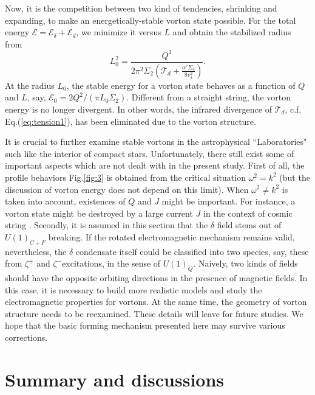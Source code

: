 \documentclass[12pt]{article}
\begin{document}
Now, it is the competition between two kind of tendencies, shrinking and expanding, to make an energetically-stable vorton state possible. For the total energy $\mathcal{E} = \mathcal{E}_\delta + \mathcal{E}_d$, we minimize it versus $L$ and obtain the stabilized radius from  
\begin{equation}
\label{eq:vortonr}
 L_0^2 = \frac{Q^2}{2\pi^2\Sigma_2(\mathcal{T}_d +
   \frac{\alpha' \Sigma_4}{8v_\delta^2})}.
\end{equation}
At the radius $L_0$, the stable energy for a vorton state behaves as a
function of $Q$ and $L$, say, $\mathcal{E}_0 = 2 Q^2/(\pi L_0 \Sigma_2)$.
Different from a straight string, the vorton energy is no longer divergent. In other words, the infrared divergence of $\mathcal{T}_d$, c.f. Eq.(\ref{eq:tension1}), has been eliminated due to the vorton structure.

It is crucial to further examine stable vortons in the astrophysical ``Laboratories" such like the interior of compact stars.
Unfortunately, there still exist some of important aspects which are not dealt with in the present study. 
First of all, the profile behaviors Fig.\ref{fig:3} is obtained from the critical situation $\omega^2 = k^2$ (but the discussion of vorton energy does not depend on this limit). When $\omega^2 \neq k^2$ is taken into account, existences of $Q$ and $J$ might be important. For instance, a vorton state might be destroyed by a large current $J$ in the context of cosmic string \cite{vilenkin2000cosmic}.
Secondly, it is assumed in this section that the $\delta$ field stems out of $U(1)_{C+F}$ breaking.
If the rotated electromagnetic mechanism remains valid, nevertheless, the $\delta$ condensate itself could be classified into two species, say, these from $\zeta^+$ and $\zeta^-$excitations, in the sense of $U(1)_{\widetilde{Q}}$. 
Naively, two kinds of fields should have the opposite orbiting directions in the presence of magnetic fields.
In this case, it is necessary to build more realistic models and study the electromagnetic properties for vortons. 
At the same time, the geometry of vorton structure needs to be reexamined. These details will leave for future studies. We hope that the basic forming mechanism presented here may survive various corrections.

\section{\bf Summary and discussions}
\label{sec:4}
\vspace{0.2cm}
\end{document}
